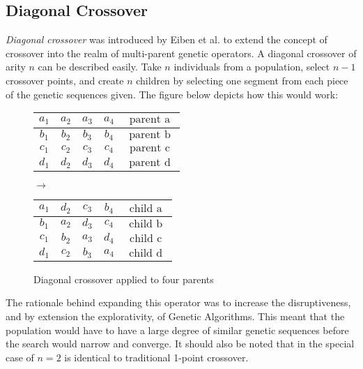 \subsection*{Diagonal Crossover}
\emph{Diagonal crossover} was introduced by Eiben et al. to extend the concept of crossover into the realm of multi-parent genetic operators\cite{Eiben03}. A diagonal crossover of arity $n$ can be described easily. Take $n$ individuals from a population, select $n-1$ crossover points, and create $n$ children by selecting one segment from each piece of the genetic sequences given\cite{Eiben95}. The figure below depicts how this would work\cite{Eiben95}:
\begin{figure}[h!]
\centering
\begin{tabular}{ | c | c | c | c | c | }
\hline
$a_1$ & $a_2$ & $a_3$ & $a_4$ & $\text{ parent a }$ 	\\ \hline
$b_1$ & $b_2$ & $b_3$ & $b_4$ & $\text{ parent b }$ 	\\ \hline
$c_1$ & $c_2$ & $c_3$ & $c_4$ & $\text{ parent c }$ 	\\ \hline
$d_1$ & $d_2$ & $d_3$ & $d_4$ & $\text{ parent d }$ 	\\ \hline
\end{tabular}
$\rightarrow$
\begin{tabular}{ | c | c | c | c | c | }
\hline
$a_1$ & $d_2$ & $c_3$ & $b_4$ & $\text{ child a }$ 	\\ \hline
$b_1$ & $a_2$ & $d_3$ & $c_4$ & $\text{ child b }$ 	\\ \hline
$c_1$ & $b_2$ & $a_3$ & $d_4$ & $\text{ child c }$ 	\\ \hline
$d_1$ & $c_2$ & $b_3$ & $a_4$ & $\text{ child d }$ 	\\ \hline
\end{tabular}
\caption{Diagonal crossover applied to four parents}
\end{figure} 

The rationale behind expanding this operator was to increase the disruptiveness, and by extension the explorativity, of Genetic Algorithms\cite{Eiben97}. This meant that the population would have to have a large degree of similar genetic sequences before the search would narrow and converge\cite{Eiben95}. It should also be noted that in the special case of $n = 2$ is identical to traditional 1-point crossover\cite{Eiben95}.

